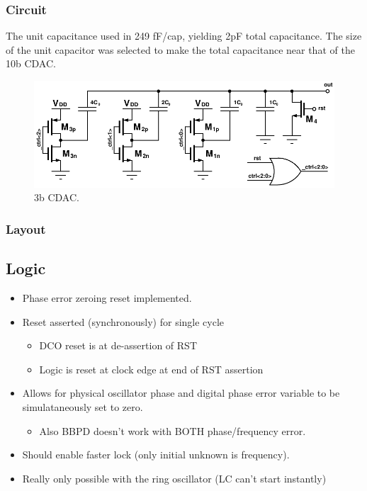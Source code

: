 		\subsubsection{Circuit}
		The unit capacitance used in 249 fF/cap, yielding 2pF total capacitance. The size of the unit capacitor was selected to make the total capacitance near that of the 10b CDAC.
			\begin{figure}[htb!]
			        \centering
			        \includegraphics[width=\textwidth, angle=0]{./figs/design/cdac_3b}
			    \caption{3b CDAC.}
			    \label{fig:3b_cdac_cir}
			\end{figure}
		\subsubsection{Layout}



	\FloatBarrier
	\subsection{Logic}





			\begin{itemize}[itemsep=4pt,label=\protect---]
			        \item Phase error zeroing reset implemented.
			        \item Reset asserted (synchronously) for single cycle 
					\begin{itemize}[itemsep=4pt,label=$\bullet$]
						\item DCO reset is at de-assertion of RST
						\item Logic is reset at clock edge at end of RST assertion
					\end{itemize}
					\item Allows for physical oscillator phase and digital phase error variable to be simulataneously set to zero.
					\begin{itemize}[itemsep=4pt,label=$\bullet$]
						\item Also BBPD doesn't work with BOTH phase/frequency error.
					\end{itemize}
					\item Should enable faster lock (only initial unknown is frequency).
					\item Really only possible with the ring oscillator (LC can't start instantly)
			\end{itemize}

